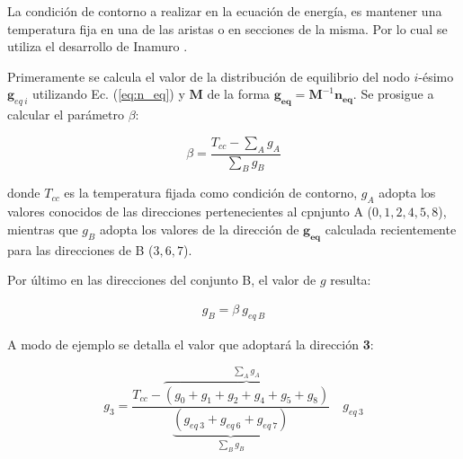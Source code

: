 La condición de contorno a realizar en la ecuación de energía, es mantener una temperatura fija en una de las aristas o en secciones de la misma. Por lo cual se utiliza el desarrollo de Inamuro \cite{inamuro2002lattice}.

Primeramente se calcula el valor de la distribución de equilibrio del nodo $i$-ésimo $\mathbf{g}_{eq\>i}$ utilizando Ec. (\ref{eq:n_eq}) y $\mathbf{M}$ de la forma $\mathbf{g_{eq}} = \mathbf{M}^{-1} \mathbf{n_{eq}}$. Se prosigue a calcular el parámetro $\beta$:

\begin{equation}
\beta = \frac{T_{cc} - \sum_{A} g_{A}}{\sum_{B} g_{B}}
\label{eq:beta}
\end{equation}

donde $T_{cc}$ es la temperatura fijada como condición de contorno, $g_{A}$ adopta los valores conocidos de las direcciones pertenecientes al cpnjunto A ($0, 1, 2, 4, 5, 8 $), mientras que $g_{B}$ adopta los valores de la dirección de $\mathbf{g_{eq}}$ calculada recientemente para las direcciones de B ($3, 6, 7$).

Por último en las direcciones del conjunto B, el valor de $g$ resulta:

\begin{align}
	g_{B} = \beta \> g_{eq \> B} 
\end{align}

A modo de ejemplo se detalla el valor que adoptará la dirección \textbf{3}:

\begin{equation}
	g_{3} = \frac{T_{cc} - \overbrace{\left( g_{0} + g_{1} +g_{2} + g_{4} + g_{5} + g_{8} \right)}^{\sum_{A} g_{A}} }{\underbrace{\left( g_{eq\>3} + g_{eq\>6} + g_{eq\>7} \right)}_{\sum_{B} g_{B} }} \quad g_{eq\>3}
\end{equation}



